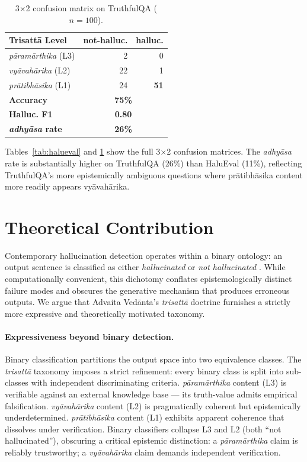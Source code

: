 \documentclass[11pt]{article}
\newcommand{\param}{\textcolor{paramcol}{\textit{pāramārthika}}}
\newcommand{\vyav}{\textcolor{vyavcol}{\textit{vyāvahārika}}}
\newcommand{\prati}{\textcolor{praticol}{\textit{prātibhāsika}}}
\newcommand{\adhyasa}{\textcolor{adhyasacol}{\textit{adhyāsa}}}
\newcommand{\trisatta}{\textit{trisattā}}
\begin{document}
\begin{table}[t]
\centering
\small
\begin{tabular}{lrr}
\toprule
\textbf{Trisattā Level} & \textbf{not-halluc.} & \textbf{halluc.} \\
\midrule
\param{} (L3) & 2  & 0 \\
\vyav{} (L2)  & 22 & 1 \\
\prati{} (L1) & 24 & \textbf{51} \\
\midrule
\textbf{Accuracy} & \multicolumn{2}{c}{\textbf{75\%}} \\
\textbf{Halluc. F1} & \multicolumn{2}{c}{\textbf{0.80}} \\
\textbf{\adhyasa{} rate} & \multicolumn{2}{c}{\textbf{26\%}} \\
\bottomrule
\end{tabular}
\caption{3$\times$2 confusion matrix on TruthfulQA ($n=100$).}
\label{tab:tqa}
\end{table}

Tables~\ref{tab:halueval} and \ref{tab:tqa} show the full 3$\times$2 confusion
matrices. The \adhyasa{} rate is substantially higher on TruthfulQA (26\%)
than HaluEval (11\%), reflecting TruthfulQA's more epistemically ambiguous
questions where prātibhāsika content more readily appears vyāvahārika.

\section{Theoretical Contribution}
\label{sec:contribution}

Contemporary hallucination detection operates within a binary ontology: an
output sentence is classified as either \emph{hallucinated} or
\emph{not hallucinated} \cite{maynez2020faithfulness,ji2023survey}. While
computationally convenient, this dichotomy conflates epistemologically distinct
failure modes and obscures the generative mechanism that produces erroneous
outputs. We argue that Advaita Ved\={a}nta's \trisatta{} doctrine furnishes a
strictly more expressive and theoretically motivated taxonomy.

\paragraph{Expressiveness beyond binary detection.}
Binary classification partitions the output space into two equivalence classes.
The \trisatta{} taxonomy imposes a strict refinement: every binary class is
split into sub-classes with independent discriminating criteria.
\param{} content (L3) is verifiable against an external knowledge base --- its
truth-value admits empirical falsification. \vyav{} content (L2) is
pragmatically coherent but epistemically underdetermined. \prati{} content (L1)
exhibits apparent coherence that dissolves under verification. Binary classifiers
collapse L3 and L2 (both ``not hallucinated''), obscuring a critical epistemic
distinction: a \param{} claim is reliably trustworthy; a \vyav{} claim demands
independent verification.
\end{document}
